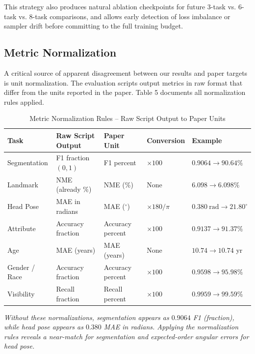 \documentclass[11pt]{article}
\begin{document}
This strategy also produces natural ablation checkpoints for future 3-task vs. 6-task vs. 8-task comparisons, and allows early detection of loss imbalance or sampler drift before committing to the full training budget.



\subsection{Metric Normalization}

A critical source of apparent disagreement between our results and paper targets is unit normalization. The evaluation scripts output metrics in raw format that differ from the units reported in the paper. Table 5 documents all normalization rules applied.

\begin{table}[H]
\centering
\scriptsize
\setlength{\tabcolsep}{3pt}
\renewcommand{\arraystretch}{1.15}
\caption{Metric Normalization Rules -- Raw Script Output to Paper Units}
\begin{tabularx}{\textwidth}{>{\RaggedRight\arraybackslash}X>{\RaggedRight\arraybackslash}X>{\RaggedRight\arraybackslash}X>{\RaggedRight\arraybackslash}X>{\RaggedRight\arraybackslash}X}
\toprule
Task & Raw Script Output & Paper Unit & Conversion & Example \\
\midrule
Segmentation & F1 fraction $(0,1)$ & F1 percent & $\times100$ & $0.9064 \rightarrow 90.64\%$ \\
Landmark & NME (already \%) & NME (\%) & None & $6.098 \rightarrow 6.098\%$ \\
Head Pose & MAE in radians & MAE ($^\circ$) & $\times 180/\pi$ & $0.380\ \mathrm{rad} \rightarrow 21.80^\circ$ \\
Attribute & Accuracy fraction & Accuracy percent & $\times100$ & $0.9137 \rightarrow 91.37\%$ \\
Age & MAE (years) & MAE (years) & None & $10.74 \rightarrow 10.74$ yr \\
Gender / Race & Accuracy fraction & Accuracy percent & $\times100$ & $0.9598 \rightarrow 95.98\%$ \\
Visibility & Recall fraction & Recall percent & $\times100$ & $0.9959 \rightarrow 99.59\%$ \\
\bottomrule
\end{tabularx}
\end{table}

\textit{Without these normalizations, segmentation appears as $0.9064$ F1 (fraction), while head pose appears as $0.380$ MAE in radians. Applying the normalization rules reveals a near-match for segmentation and expected-order angular errors for head pose.}
\end{document}
